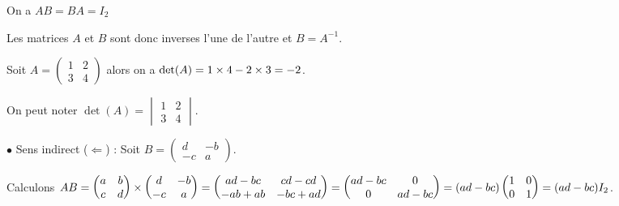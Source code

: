 \documentclass[10pt,a4paper]{article}
\begin{document}
On a $AB=BA=I_2$

Les matrices $A$ et $B$ sont donc inverses l'une de l'autre et $B=A^{-1}$.

\rema {}
 

\exe Soit $A=\begin{pmatrix} 1&2 \\ 3&4\end{pmatrix}$ alors on a $\det(A)=1 \times 4 - 2 \times3=-2$.

On peut noter $\det(A)=\begin{vmatrix} 1&2 \\ 3&4\end{vmatrix}$.




\dem

$\bullet$ Sens indirect ($\Leftarrow$) : Soit $B= \begin{pmatrix}   d&-b\\-c&a  \end{pmatrix}$.

Calculons $AB=\begin{pmatrix}   a&b\\c&d  \end{pmatrix} \times \begin{pmatrix}   d&-b\\-c&a  \end{pmatrix} = 
\begin{pmatrix}   ad-bc&cd-cd\\-ab+ab&-bc+ad  \end{pmatrix} = \begin{pmatrix}   ad-bc&0\\0&ad-bc  \end{pmatrix}
=(ad-bc) \begin{pmatrix}   1&0\\0&1  \end{pmatrix}= (ad-bc) I_2$.
\end{document}
